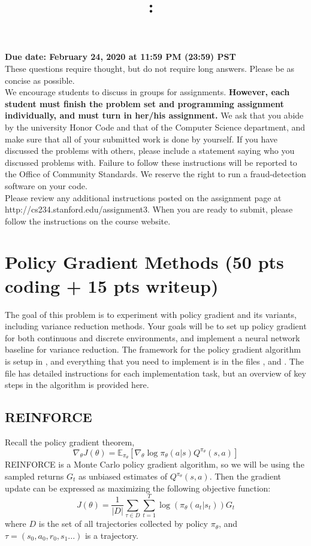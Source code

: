 \documentclass{article}
\title{
\vspace{-1in}
\textmd{\textbf{\hmwkClass:\ \hmwkTitle}}}
\author{}
\date{} %
\begin{document}
\maketitle
\vspace{-.5in}
\begin{framed}
{\bf Due date: February 24, 2020 at 11:59 PM (23:59) PST}
\\[1em]
These questions require thought, but do not require long answers. Please be as concise as possible.
\\[1em]
We encourage students to discuss in groups for assignments. \textbf{However, each student must finish the
problem set and programming assignment individually, and must turn in her/his assignment.} We ask
that you abide by the university Honor Code and that of the Computer Science department, and make
sure that all of your submitted work is done by yourself. If you have discussed the problems with others,
please include a statement saying who you discussed problems with. Failure to follow these instructions
will be reported to the Office of Community Standards. We reserve the right to run a fraud-detection software on your code.
\\[1em]
Please review any additional instructions posted on the assignment page at
http://cs234.stanford.edu/assignment3. When you are ready to submit, please
follow the instructions on the course website.
\\[1em]
\end{framed}


\section{Policy Gradient Methods (50 pts coding + 15 pts writeup)}
The goal of this problem is to experiment with policy gradient and its variants, including variance reduction methods. Your goals will be to set up policy gradient for both continuous and discrete environments, and implement a neural network baseline for variance reduction. The framework for the policy gradient algorithm is setup in , and everything that you need to implement is in the files ,  and . The file has detailed instructions for each implementation task, but an overview of key steps in the algorithm is provided here.
\subsection{REINFORCE}
Recall the policy gradient theorem,
\[ \nabla_\theta J(\theta) = \mathbb E_{\pi_\theta} \left[ \nabla_\theta \log\pi_\theta(a|s) Q^{\pi_\theta} (s,a) \right] \]
REINFORCE is a Monte Carlo policy gradient algorithm, so we will be using the sampled returns $G_t$ as unbiased estimates of $Q^{\pi_\theta}(s,a)$.
Then the gradient update can be expressed as maximizing the following objective function:
\[ J(\theta) = \frac{1}{|D|} \sum_{\tau \in D} \sum_{t=1}^T \log(\pi_\theta(a_t|s_t)) G_t \]
where $D$ is the set of all trajectories collected by policy $\pi_\theta$, and $\tau=(s_0, a_0, r_0,s_1...)$ is a trajectory.
\end{document}
